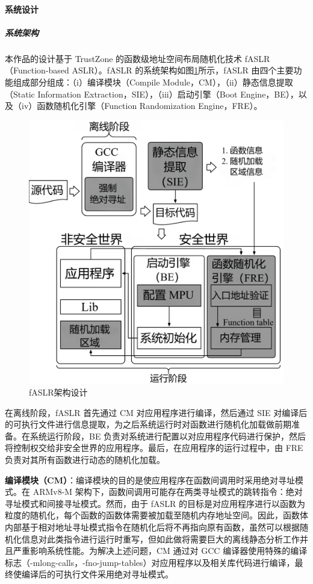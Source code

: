 \documentclass[12pt,a4paper]{ctexart}
\numberwithin{figure}{section}
\begin{document}
\paragraph{系统设计}
\subparagraph{系统架构}
\par 本作品的设计基于 TrustZone 的函数级地址空间布局随机化技术 fASLR（Function-based ASLR）。fASLR 的系统架构如图\ref{fig:alsr_architecture}所示，fASLR 由四个主要功能组成部分组成：（i）编译模块（Compile Module，CM），（ii）静态信息提取（Static Information Extraction，SIE），（iii）启动引擎（Boot Engine，BE），以及（iv）函数随机化引擎（Function Randomization Engine，FRE）。
\begin{figure}[H]
    \centering
    \includegraphics[scale=0.3]{graph/aslr_architecture.png}
    \caption{fASLR架构设计}
    \label{fig:alsr_architecture}
\end{figure}
\par 在离线阶段，fASLR 首先通过 CM 对应用程序进行编译，然后通过 SIE 对编译后的可执行文件进行信息提取，为之后系统运行时对函数进行随机化加载做前期准备。在系统运行阶段，BE 负责对系统进行配置以对应用程序代码进行保护，然后将控制权交给非安全世界的应用程序。最后，在应用程序的运行过程中，由 FRE 负责对其所有函数进行动态的随机化加载。
\par \textbf{编译模块（CM）}：编译模块的目的是使应用程序在函数间调用时采用绝对寻址模式。在 ARMv8-M 架构下，函数间调用可能存在两类寻址模式的跳转指令：绝对寻址模式和间接寻址模式。然而，由于 fASLR 的目标是对应用程序进行以函数为粒度的随机化，每个函数的函数体需要被加载至随机内存地址空间。因此，函数体内部基于相对地址寻址模式指令在随机化后将不再指向原有函数，虽然可以根据随机化信息对此类指令进行运行时重写，但如此做将需要巨大的离线静态分析工作并且严重影响系统性能。为解决上述问题，CM 通过对 GCC 编译器使用特殊的编译标志（-mlong-calls，-fno-jump-tables）对应用程序以及相关库代码进行编译，最终使编译后的可执行文件采用绝对寻址模式。
\end{document}
